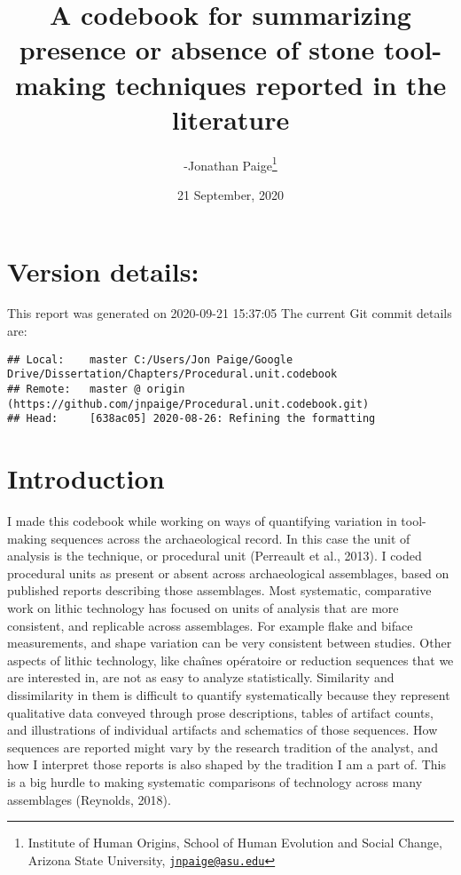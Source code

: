 \documentclass[
]{article}
\title{A codebook for summarizing presence or absence of stone tool-making
techniques reported in the literature}
\author{-Jonathan Paige\footnote{Institute of Human Origins, School of Human
  Evolution and Social Change, Arizona State University,
  \href{mailto:jnpaige@asu.edu}{\nolinkurl{jnpaige@asu.edu}}}}
\date{21 September, 2020}
\begin{document}
\maketitle

{
\setcounter{tocdepth}{3}
\tableofcontents
}
\hypertarget{version-details}{%
\section{Version details:}\label{version-details}}

This report was generated on 2020-09-21 15:37:05 The current Git commit
details are:

\begin{verbatim}
## Local:    master C:/Users/Jon Paige/Google Drive/Dissertation/Chapters/Procedural.unit.codebook
## Remote:   master @ origin (https://github.com/jnpaige/Procedural.unit.codebook.git)
## Head:     [638ac05] 2020-08-26: Refining the formatting
\end{verbatim}

\hypertarget{introduction}{%
\section{Introduction}\label{introduction}}

I made this codebook while working on ways of quantifying variation in
tool-making sequences across the archaeological record. In this case the
unit of analysis is the technique, or procedural unit (Perreault et al.,
2013). I coded procedural units as present or absent across
archaeological assemblages, based on published reports describing those
assemblages. Most systematic, comparative work on lithic technology has
focused on units of analysis that are more consistent, and replicable
across assemblages. For example flake and biface measurements, and shape
variation can be very consistent between studies. Other aspects of
lithic technology, like chaînes opératoire or reduction sequences that
we are interested in, are not as easy to analyze statistically.
Similarity and dissimilarity in them is difficult to quantify
systematically because they represent qualitative data conveyed through
prose descriptions, tables of artifact counts, and illustrations of
individual artifacts and schematics of those sequences. How sequences
are reported might vary by the research tradition of the analyst, and
how I interpret those reports is also shaped by the tradition I am a
part of. This is a big hurdle to making systematic comparisons of
technology across many assemblages (Reynolds, 2018).
\end{document}
